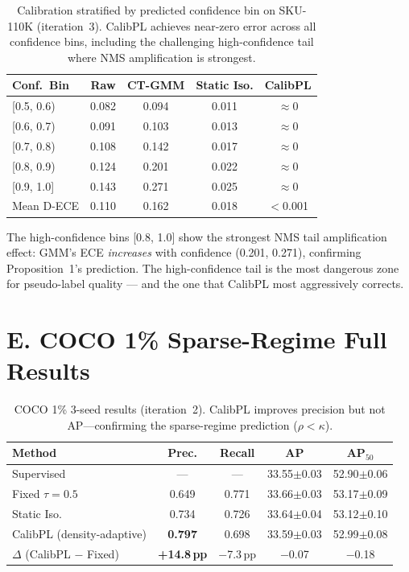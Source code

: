 \documentclass[10pt,twocolumn,letterpaper]{article}
\begin{document}
\begin{table}[h]
  \centering
  \caption{Calibration stratified by predicted confidence bin on SKU-110K
  (iteration~3). CalibPL achieves near-zero error across all confidence bins,
  including the challenging high-confidence tail where NMS amplification is
  strongest.}
  \begin{tabular}{lcccc}
    \toprule
    Conf.\ Bin & Raw & CT-GMM & Static Iso. & CalibPL \\
    \midrule
    {[0.5, 0.6)} & 0.082 & 0.094 & 0.011 & $\approx$0 \\
    {[0.6, 0.7)} & 0.091 & 0.103 & 0.013 & $\approx$0 \\
    {[0.7, 0.8)} & 0.108 & 0.142 & 0.017 & $\approx$0 \\
    {[0.8, 0.9)} & 0.124 & 0.201 & 0.022 & $\approx$0 \\
    {[0.9, 1.0]} & 0.143 & 0.271 & 0.025 & $\approx$0 \\
    \midrule
    Mean D-ECE  & 0.110 & 0.162 & 0.018 & $<$0.001 \\
    \bottomrule
  \end{tabular}
  \label{tab:per_bin_ece}
\end{table}

The high-confidence bins [0.8, 1.0] show the strongest NMS tail amplification
effect: GMM's ECE \emph{increases} with confidence (0.201, 0.271), confirming
Proposition~1's prediction. The high-confidence tail is the most dangerous zone
for pseudo-label quality --- and the one that CalibPL most aggressively corrects.

\section*{E. COCO 1\% Sparse-Regime Full Results}
\label{sec:supp_coco}

\begin{table}[h]
  \centering
  \caption{COCO 1\% 3-seed results (iteration~2). CalibPL improves precision
  but not AP---confirming the sparse-regime prediction ($\rho<\kappa$).}
  \begin{tabular}{lcccc}
    \toprule
    \textbf{Method} & \textbf{Prec.} & \textbf{Recall} & \textbf{AP} & \textbf{AP$_{50}$} \\
    \midrule
    Supervised      & ---   & ---   & 33.55$\pm$0.03 & 52.90$\pm$0.06 \\
    Fixed $\tau{=}0.5$ & 0.649 & 0.771 & 33.66$\pm$0.03 & 53.17$\pm$0.09 \\
    Static Iso.     & 0.734 & 0.726 & 33.64$\pm$0.04 & 53.12$\pm$0.10 \\
    CalibPL (density-adaptive) & \textbf{0.797} & 0.698 & 33.59$\pm$0.03 & 52.99$\pm$0.08 \\
    \midrule
    $\Delta$ (CalibPL $-$ Fixed) & \textbf{+14.8\,pp} & $-$7.3\,pp & $-$0.07 & $-$0.18 \\
    \bottomrule
  \end{tabular}
  \label{tab:supp_coco}
\end{table}
\end{document}
